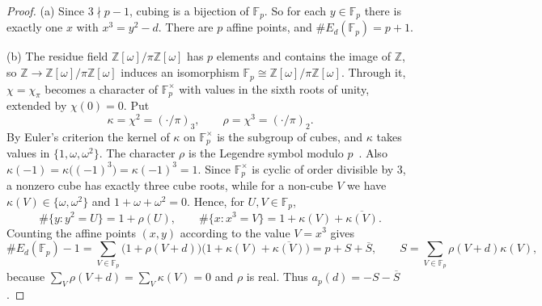 \documentclass[11pt]{article}
\numberwithin{equation}{section}
\newcommand{\OO}{\mathbb Z[\omega]}
\begin{document}
\begin{proof}
(a) Since $3\nmid p-1$, cubing is a bijection of $\mathbb F_p$. So for each $y\in\mathbb F_p$ there is exactly one $x$
with $x^3=y^2-d$. There are $p$ affine points, and $\#E_d(\mathbb F_p)=p+1$.

(b) The residue field $\OO/\pi\OO$ has $p$ elements and contains the image of $\mathbb Z$, so
$\mathbb Z\to\OO/\pi\OO$ induces an isomorphism $\mathbb F_p\cong\OO/\pi\OO$. Through it, $\chi=\chi_\pi$ becomes a
character of $\mathbb F_p^\times$ with values in the sixth roots of unity, extended by $\chi(0)=0$. Put
\begin{equation}\label{eq:d013}
 \kappa=\chi^2=(\cdot/\pi)_3,\qquad \rho=\chi^3=(\cdot/\pi)_2 .
\end{equation}
By Euler's criterion the kernel of $\kappa$ on $\mathbb F_p^\times$ is the subgroup of cubes, and $\kappa$ takes
values in $\{1,\omega,\omega^2\}$. The character $\rho$ is the Legendre symbol modulo $p$~\cite[(3.6)]{QF}. Also
$\kappa(-1)=\kappa\bigl((-1)^3\bigr)=\kappa(-1)^3=1$. Since $\mathbb F_p^\times$ is cyclic of order divisible by $3$,
a nonzero cube has exactly three cube roots, while for a non-cube $V$ we have $\kappa(V)\in\{\omega,\omega^2\}$ and
$1+\omega+\omega^2=0$. Hence, for $U,V\in\mathbb F_p$,
\begin{equation}\label{eq:d014}
 \#\{y:y^2=U\}=1+\rho(U),\qquad \#\{x:x^3=V\}=1+\kappa(V)+\overline{\kappa(V)} .
\end{equation}
Counting the affine points $(x,y)$ according to the value $V=x^3$ gives
\begin{equation}\label{eq:b1-count}
 \#E_d(\mathbb F_p)-1=\sum_{V\in\mathbb F_p}\bigl(1+\rho(V+d)\bigr)\bigl(1+\kappa(V)+\overline{\kappa(V)}\bigr)
 =p+S+\overline S,\qquad S=\sum_{V\in\mathbb F_p}\rho(V+d)\kappa(V),
\end{equation}
because $\sum_V\rho(V+d)=\sum_V\kappa(V)=0$ and $\rho$ is real. Thus $a_p(d)=-S-\overline S$.


\end{proof}
\end{document}
